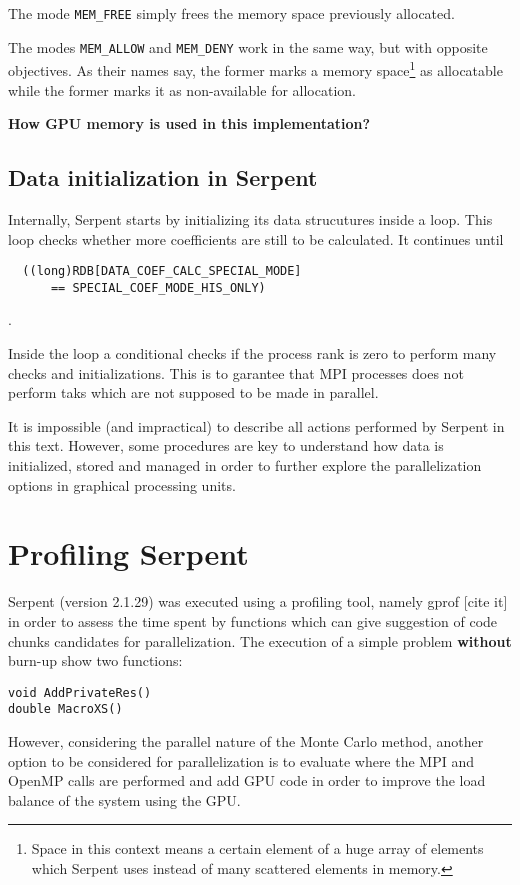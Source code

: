 \documentclass[twoside,a4paper,12pt,english,draft]{anstrans}
\begin{document}
%

The mode \texttt{MEM\_FREE} simply frees the memory space previously allocated.

The modes \texttt{MEM\_ALLOW} and \texttt{MEM\_DENY} work in the same way, but with opposite objectives. As
their names say, the former marks a memory space\footnote{Space in this context means a certain element of a huge array
of elements which Serpent uses instead of many scattered elements in memory.} as allocatable while the former marks it as non-available
for allocation.



\textbf{How GPU memory is used in this implementation?}

\subsection{Data initialization in Serpent}
Internally, Serpent starts by initializing its data strucutures inside a loop. This loop checks
whether more coefficients are still to be calculated. It continues until \begin{verbatim}
  ((long)RDB[DATA_COEF_CALC_SPECIAL_MODE]
      == SPECIAL_COEF_MODE_HIS_ONLY)
\end{verbatim}.

Inside the loop a conditional checks if the process rank is zero to perform many checks and initializations.
This is to garantee that MPI processes does not perform taks which are not supposed to be made in parallel.

It is impossible (and impractical) to describe all actions performed by Serpent in this text. However, some
procedures are key to understand how data is initialized, stored and managed in order to further explore
the parallelization options in graphical processing units.

\section{Profiling Serpent}

Serpent (version 2.1.29) was executed using a profiling tool, namely gprof [cite it] in order
to assess the time spent by functions which can give suggestion of code chunks candidates for
parallelization. The execution of a simple problem \textbf{without} burn-up show two functions:
\begin{verbatim}
void AddPrivateRes()
double MacroXS()
\end{verbatim}
However, considering the parallel nature of the Monte Carlo method, another option to be considered
for parallelization is to evaluate where the MPI and OpenMP calls are performed and add GPU code
in order to improve the load balance of the system using the GPU.
\end{document}
